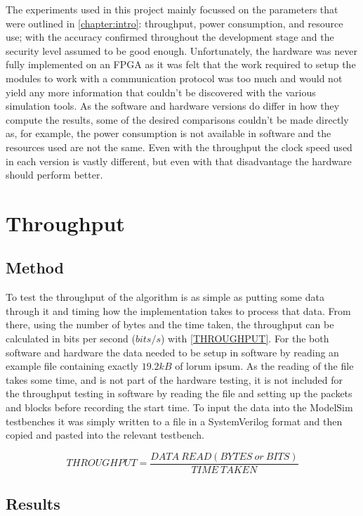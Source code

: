 \documentclass[12pt,twoside,a4paper]{report}
\begin{document}
	The experiments used in this project mainly focussed on the parameters that were outlined in \autoref{chapter:intro}: throughput, power consumption, and resource use; with the accuracy confirmed throughout the development stage and the security level assumed to be good enough. Unfortunately, the hardware was never fully implemented on an FPGA as it was felt that the work required to setup the modules to work with a communication protocol was too much and would not yield any more information that couldn't be discovered  with the various simulation tools. As the software and hardware versions do differ in how they compute the results, some of the desired comparisons couldn't be made directly as, for example, the power consumption is not available in software and the resources used are not the same. Even with the throughput the clock speed used in each version is vastly different, but even with that disadvantage the hardware should perform better.
	
	\section{Throughput}
	
	\subsection{Method}
	To test the throughput of the algorithm is as simple as putting some data through it and timing how the implementation takes to process that data. From there, using the number of bytes and the time taken, the throughput can be calculated in bits per second ($bits/s$) with \autoref{THROUGHPUT}. For the both software and hardware the data needed to be setup in software by reading an example file containing exactly $19.2kB$ of lorum ipsum. As the reading of the file takes some time, and is not part of the hardware testing, it is not included for the throughput testing in software by reading the file and setting up the packets and blocks before recording the start time. To input the data into the ModelSim testbenches it was simply written to a file in a SystemVerilog format and then copied and pasted into the relevant testbench.

	\begin{equation}
	\label{THROUGHPUT}
	THROUGHPUT = \frac{DATA\ READ(BYTES\ or\ BITS)}{TIME\ TAKEN}
	\end{equation}
	
	\subsection{Results}
	
\end{document}
